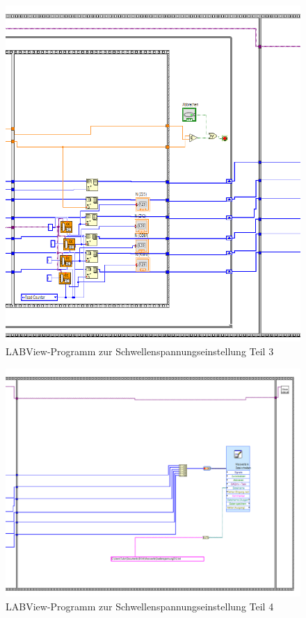 \documentclass{article}
\begin{document}
\begin{figure}
    \centering
    \includegraphics[width=1\textwidth]{figures/ProgrammScreen3.png}
    \caption{LABView-Programm zur Schwellenspannungseinstellung Teil 3}
    \label{fig:LABView3}
\end{figure}
\begin{figure}
    \centering
    \includegraphics[width=1\textwidth]{figures/ProgrammScreen4.png}
    \caption{LABView-Programm zur Schwellenspannungseinstellung Teil 4}
    \label{fig:LABView4}
\end{figure}
\end{document}
